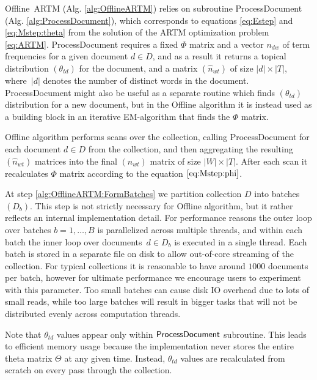\documentclass[russian,english]{llncs}
\newcommand{\kw}[1]{\mbox{\textsf{#1}}}
\begin{document}
\kw{Offline ARTM} (Alg. \ref{alg:OfflineARTM}) relies on subroutine
\kw{ProcessDocument} (Alg. \ref{alg:ProcessDocument}),
which corresponds to equations \eqref{eq:Estep} and \eqref{eq:Mstep:theta}
from the solution of the ARTM optimization problem \eqref{eq:ARTM}.
\kw{ProcessDocument} requires a fixed $\Phi$ matrix
and a vector $n_{dw}$ of term frequencies for a given document $d \in D$,
and as a result it returns a topical distribution $(\theta_{td})$ for the document,
and a matrix $(\hat n_{wt})$ of size $|d| \times |T|$,
where~$|d|$ denotes the number of distinct words in the document.
\kw{ProcessDocument} might also be useful as a separate routine which finds $(\theta_{td})$ distribution for a new document,
but in the \kw{Offline} algorithm it is instead used as a building block in an iterative EM-algorithm that finds the $\Phi$ matrix.

\kw{Offline} algorithm performs scans over the collection, calling \kw{ProcessDocument}
for each document $d \in D$ from the collection,
and then aggregating the resulting $(\hat n_{wt})$ matrices into the final $(n_{wt})$ matrix of size $|W| \times |T|$.
After each scan it recalculates $\Phi$ matrix according to the equation $\eqref{eq:Mstep:phi}$.


At step \ref{alg:OfflineARTM:FormBatches} we partition collection $D$ into batches $(D_b)$.
This step is not strictly necessary for \kw{Offline} algorithm,
but it rather reflects an internal implementation detail.
For performance reasons the outer loop over batches $b = 1, \dots, B$ is parallelized across multiple threads,
and within each batch the inner loop over documents~$d \in D_b$
is executed in a single thread.
Each batch is stored in a separate file on disk to allow out-of-core streaming of the collection.
For typical collections it is reasonable to have around $1000$ documents per batch,
however for ultimate performance we encourage users to experiment with this parameter.
Too small batches can cause disk IO overhead due to lots of small reads,
while too large batches will result in bigger tasks that will not be distributed evenly across computation threads.

Note that $\theta_{td}$ values appear only within $\kw{ProcessDocument}$ subroutine.
This leads to efficient memory usage because the implementation never stores the entire theta matrix $\Theta$ at any given time.
Instead, $\theta_{td}$ values are recalculated from scratch on every pass through the collection.
\end{document}
